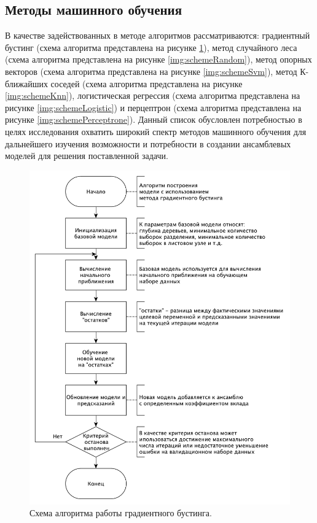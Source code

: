 \subsection{Методы машинного обучения}

В качестве задействованных в методе алгоритмов рассматриваются: градиентный бустинг (схема алгоритма представлена на рисунке \ref{img:schemeGradient}), метод случайного леса (схема алгоритма представлена на рисунке \ref{img:schemeRandom}), метод опорных векторов (схема алгоритма представлена на рисунке \ref{img:schemeSvm}), метод К-ближайших соседей (схема алгоритма представлена на рисунке \ref{img:schemeKnn}), логистическая регрессия (схема алгоритма представлена на рисунке \ref{img:schemeLogistic}) и перцептрон (схема алгоритма представлена на рисунке \ref{img:schemePerceptrone}). Данный список обусловлен потребностью в целях исследования охватить широкий спектр методов машинного обучения для дальнейшего изучения возможности и потребности в создании ансамблевых моделей для решения поставленной задачи.

\begin{figure}[H]
	\centering
	\includegraphics[width=\textwidth]{inc/schemeGradient.pdf}
	\caption{ Схема алгоритма работы градиентного бустинга. }
	\label{img:schemeGradient}
\end{figure}

